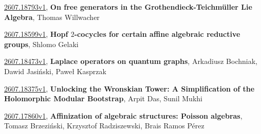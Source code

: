 \documentclass[9pt, a4paper]{article}
\theoremstyle{plain}
\theoremstyle{definition}
\theoremstyle{remark}
\newcommand{\arxiv}[3]{\href{https://arxiv.org/abs/#1}{#1}, \textbf{\textcolor{arxivblue}{#2}}, #3}
\begin{document}
\arxiv{2607.18793v1}{On free generators in the Grothendieck-Teichmüller Lie Algebra}{Thomas Willwacher}

\arxiv{2607.18599v1}{Hopf $2$-cocycles for certain affine algebraic reductive groups}{Shlomo Gelaki}

\arxiv{2607.18473v1}{Laplace operators on quantum graphs}{Arkadiusz Bochniak, Dawid Jasiński, Paweł Kasprzak}

\arxiv{2607.18375v1}{Unlocking the Wronskian Tower: A Simplification of the Holomorphic Modular Bootstrap}{Arpit Das, Sunil Mukhi}

\arxiv{2607.17860v1}{Affinization of algebraic structures: Poisson algebras}{Tomasz Brzeziński, Krzysztof Radziszewski, Brais Ramos Pérez}

\end{document}
